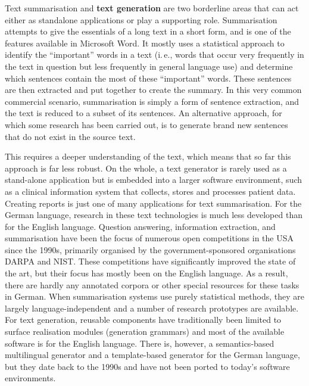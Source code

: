 \documentclass[]{../../metanetpaper}
\begin{document}
\begin{multicols}{2}

Text summarisation and \textbf{text generation} are two borderline areas that can act either as standalone applications or play a supporting role. Summarisation attempts to give the essentials of a long text in a short form, and is one of the features available in Microsoft Word. It mostly uses a statistical approach to identify the “important” words in a text (i.\,e., words that occur very frequently in the text in question but less frequently in general language use) and determine which sentences contain the most of these “important” words. These sentences are then extracted and put together to create the summary. In this very common commercial scenario, summarisation is simply a form of sentence extraction, and the text is reduced to a subset of its sentences. An alternative approach, for which some research has been carried out, is to generate brand new sentences that do not exist in the source text.


This requires a deeper understanding of the text, which means that so far this approach is far less robust. On the whole, a text generator is rarely used as a stand-alone application but is embedded into a larger software environment, such as a clinical information system that collects, stores and processes patient data. Creating reports is just one of many applications for text summarisation. 
For the German language, research in these text technologies is much less developed than for the English language. Question answering, information extraction, and summarisation have been the focus of numerous open competitions in the USA since the 1990s, primarily organised by the government-sponsored organisations DARPA and NIST. These competitions have significantly improved the state of the art, but their focus has mostly been on the English language. As a result, there are hardly any annotated corpora or other special resources for these tasks in German. When summarisation systems use purely statistical methods, they are largely language-independent and a number of research prototypes are available. For text generation, reusable components have traditionally been limited to surface realisation modules (generation grammars) and most of the available software is for the English language. There is, however, a semantics-based multilingual generator and a template-based generator for the German language, but they date back to the 1990s and have not been ported to today’s software environments.


\end{multicols}
\end{document}
